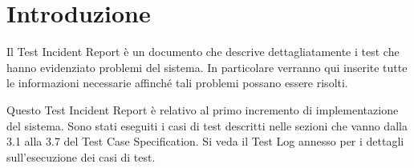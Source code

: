 \chapter{Introduzione}
Il Test Incident Report è un documento che descrive dettagliatamente i test che hanno evidenziato problemi del sistema. In particolare verranno qui inserite tutte le informazioni necessarie affinché tali problemi possano essere risolti.

Questo Test Incident Report è relativo al primo incremento di implementazione del sistema. Sono stati eseguiti i casi di test descritti nelle sezioni che vanno dalla 3.1 alla 3.7 del Test Case Specification. Si veda il Test Log annesso per i dettagli sull'esecuzione dei casi di test.